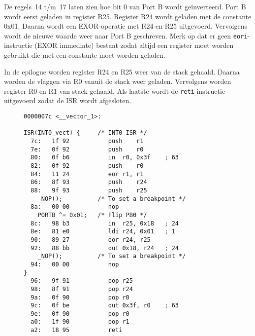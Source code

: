 De regels~14 t/m~17 laten zien hoe bit 0 van Port B wordt ge\"inverteerd.
Port B wordt eerst geladen in register R25. Register R24 wordt geladen
met de constante 0x01. Daarna wordt een EXOR-operatie met R24 en R25
uitgevoerd. Vervolgens wordt de nieuwe waarde weer naar Port B geschreven.
Merk op dat er geen \lstinline|eori|-instructie (EXOR immediate) bestaat
zodat altijd een register moet worden gebruikt die met een constante
moet worden geladen.

In de epilogue worden register R24 en R25 weer van de stack gehaald.
Daarna worden de vlaggen via R0 vanuit de stack weer geladen. Vervolgens
worden register R0 en R1 van stack gehaald. Als laatste wordt de
\lstinline|reti|-instructie uitgevoerd zodat de ISR wordt afgesloten.

\begin{figure}[!ht]
\begin{lstlisting}[language=AVRassembler,caption=De ISR voor INT0.,label=cod:intasscode3]
0000007c <__vector_1>:

ISR(INT0_vect) {     /* INT0 ISR */
  7c:	1f 92       	push	r1
  7e:	0f 92       	push	r0
  80:	0f b6       	in	r0, 0x3f	; 63
  82:	0f 92       	push	r0
  84:	11 24       	eor	r1, r1
  86:	8f 93       	push	r24
  88:	9f 93       	push	r25
	_NOP();          /* To set a breakpoint */
  8a:	00 00       	nop
	PORTB ^= 0x01;   /* Flip PB0 */
  8c:	98 b3       	in	r25, 0x18	; 24
  8e:	81 e0       	ldi	r24, 0x01	; 1
  90:	89 27       	eor	r24, r25
  92:	88 bb       	out	0x18, r24	; 24
	_NOP();          /* To set a breakpoint */
  94:	00 00       	nop
}
  96:	9f 91       	pop	r25
  98:	8f 91       	pop	r24
  9a:	0f 90       	pop	r0
  9c:	0f be       	out	0x3f, r0	; 63
  9e:	0f 90       	pop	r0
  a0:	1f 90       	pop	r1
  a2:	18 95       	reti
\end{lstlisting}
\end{figure}


